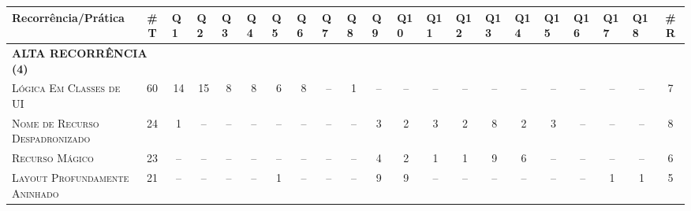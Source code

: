 \begin{table*}
\centering
\footnotesize
\begin{tabular}{@{}p{4.2cm}p{0.3cm}p{.2cm}p{.2cm}p{.2cm}p{.2cm}p{.2cm}p{.2cm}p{.2cm}p{.2cm}p{.2cm}p{.4cm}p{.4cm}p{.4cm}p{.4cm}p{.4cm}p{.4cm}p{.4cm}p{.4cm}p{.4cm}p{0.2cm}@{}}
\toprule
\textbf{Recorrência/Prática} & \multicolumn{1}{c}{\textbf{\#T}} & Q1 & Q2 & Q3 & Q4 & Q5 & Q6 & Q7 & Q8 & Q9 & Q10 & Q11 & Q12 & Q13 & Q14 & Q15 & Q16 & Q17 & Q18 &  \multicolumn{1}{c}{\textbf{\#R}} \\
\hline
\multicolumn{2}{l}{\scriptsize{\textbf{ALTA RECORRÊNCIA (4)}}} \\
\textsc{Lógica Em Classes de UI}					& \multicolumn{1}{c}{60} 	& \multicolumn{1}{c}{14} 	& \multicolumn{1}{c}{15} 	& \multicolumn{1}{c}{8}		& \multicolumn{1}{c}{8}		& \multicolumn{1}{c}{6}		& \multicolumn{1}{c}{8}		& \multicolumn{1}{c}{--}	& \multicolumn{1}{c}{1}		& \multicolumn{1}{c}{--}	& \multicolumn{1}{c}{--}	& \multicolumn{1}{c}{--}	& \multicolumn{1}{c}{--}	& \multicolumn{1}{c}{--}	& \multicolumn{1}{c}{--}	& \multicolumn{1}{c}{--}	& \multicolumn{1}{c}{--}	& \multicolumn{1}{c}{--} 	& \multicolumn{1}{c}{--}	& \multicolumn{1}{c}{7} \\
\textsc{Nome de Recurso Despadronizado}		& \multicolumn{1}{c}{24} 	& \multicolumn{1}{c}{1} 	& \multicolumn{1}{c}{--} 	& \multicolumn{1}{c}{--}	& \multicolumn{1}{c}{--}	& \multicolumn{1}{c}{--}	& \multicolumn{1}{c}{--}	& \multicolumn{1}{c}{--}	& \multicolumn{1}{c}{--}	& \multicolumn{1}{c}{3}		& \multicolumn{1}{c}{2}		& \multicolumn{1}{c}{3}		& \multicolumn{1}{c}{2}		& \multicolumn{1}{c}{8}		& \multicolumn{1}{c}{2}		& \multicolumn{1}{c}{3}		& \multicolumn{1}{c}{--}	& \multicolumn{1}{c}{--} 	& \multicolumn{1}{c}{--}	& \multicolumn{1}{c}{8} \\
\textsc{Recurso Mágico}										& \multicolumn{1}{c}{23} 	& \multicolumn{1}{c}{--} 	& \multicolumn{1}{c}{--} 	& \multicolumn{1}{c}{--}	& \multicolumn{1}{c}{--}	& \multicolumn{1}{c}{--}	& \multicolumn{1}{c}{--}	& \multicolumn{1}{c}{--}	& \multicolumn{1}{c}{--}	& \multicolumn{1}{c}{4}		& \multicolumn{1}{c}{2}		& \multicolumn{1}{c}{1}		& \multicolumn{1}{c}{1}		& \multicolumn{1}{c}{9}		& \multicolumn{1}{c}{6}		& \multicolumn{1}{c}{--}	& \multicolumn{1}{c}{--}	& \multicolumn{1}{c}{--} 	& \multicolumn{1}{c}{--}	& \multicolumn{1}{c}{6} \\
\textsc{Layout Profundamente Aninhado}		& \multicolumn{1}{c}{21} 	& \multicolumn{1}{c}{--} 	& \multicolumn{1}{c}{--} 	& \multicolumn{1}{c}{--}	& \multicolumn{1}{c}{--}	& \multicolumn{1}{c}{1}		& \multicolumn{1}{c}{--}	& \multicolumn{1}{c}{--}	& \multicolumn{1}{c}{--}	& \multicolumn{1}{c}{9}		& \multicolumn{1}{c}{9}		& \multicolumn{1}{c}{--}	& \multicolumn{1}{c}{--}	& \multicolumn{1}{c}{--}	& \multicolumn{1}{c}{--}	& \multicolumn{1}{c}{--}	& \multicolumn{1}{c}{--}	& \multicolumn{1}{c}{1} 	& \multicolumn{1}{c}{1}		& \multicolumn{1}{c}{5} \\


\end{tabular}
\end{table*}
